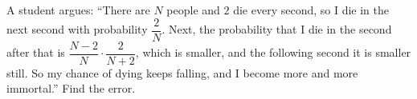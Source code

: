 A student argues: ``There are $N$ people and $2$ die every second, so I die in the next second with probability $\dfrac{2}{N}$. Next, the probability that I die in the second after that is $\dfrac{N-2}{N}\cdot\dfrac{2}{N+2}$, which is smaller, and the following second it is smaller still. So my chance of dying keeps falling, and I become more and more immortal.'' Find the error.
